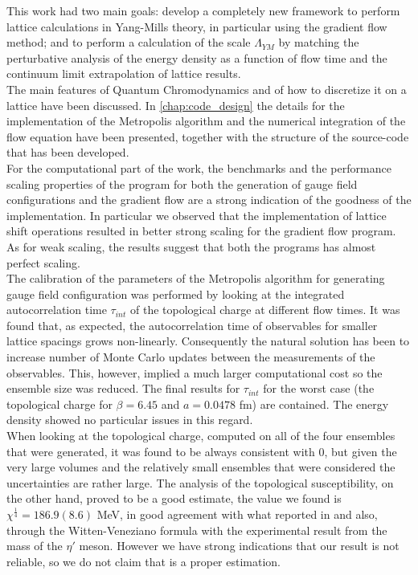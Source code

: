 This work had two main goals: develop a completely new framework to perform lattice calculations in Yang-Mills theory, in particular using the gradient flow method; and to perform a calculation of the scale $\Lambda_{YM}$ by matching the perturbative analysis of the energy density as a function of flow time and the continuum limit extrapolation of lattice results.\\

The main features of Quantum Chromodynamics and of how to discretize it on a lattice have been discussed. In \cref{chap:code_design} the details for the implementation of the Metropolis algorithm and the numerical integration of the flow equation have been presented, together with the structure of the source-code that has been developed. \\
For the computational part of the work, the benchmarks and the performance scaling properties of the program for both the generation of gauge field configurations and the gradient flow are a strong indication of the goodness of the implementation. In particular we observed that the implementation of lattice shift operations resulted in better strong scaling for the gradient flow program. As for weak scaling, the results suggest that both the programs has almost perfect scaling. \\
The calibration of the parameters of the Metropolis algorithm for generating gauge field configuration was performed by looking at the integrated autocorrelation time $\tau_{int}$ of the topological charge at different flow times. It was found that, as expected, the autocorrelation time of observables for smaller lattice spacings grows non-linearly. Consequently the natural solution has been to increase number of Monte Carlo updates between the measurements of the observables. This, however, implied a much larger computational cost so the ensemble size was reduced. The final results for $\tau_{int}$ for the worst case (the topological charge for $\beta = 6.45$ and $a=0.0478$ fm) are contained. The energy density showed no particular issues in this regard.\\
When looking at the topological charge, computed on all of the four ensembles that were generated, it was found to be always consistent with 0, but given the very large volumes and the relatively small ensembles that were considered the uncertainties are rather large. The analysis of the topological susceptibility, on the other hand, proved to be a good estimate, the value we found is $\chi^{\frac{1}{4}} = 186.9(8.6)$ MeV, in good agreement with what reported in \cite{luscher_properties_2010,shindler_nucleon_2015} and also, through the Witten-Veneziano formula with the experimental result from the mass of the $\eta'$ meson. However we have strong indications that our result is not reliable, so we do not claim that is a proper estimation.\\

